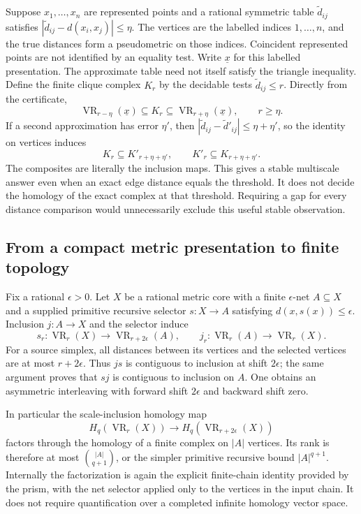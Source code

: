 Suppose $x_1,\ldots,x_n$ are represented points and a rational symmetric
table $\widetilde d_{ij}$ satisfies
$|\widetilde d_{ij}-d(x_i,x_j)|\leq\eta$.
The vertices are the labelled indices $1,\ldots,n$, and the true distances
form a pseudometric on those indices. Coincident represented points are
not identified by an equality test. Write $\underline x$ for this labelled
presentation. The approximate table need not itself satisfy the triangle
inequality. Define the finite clique complex $K_r$ by the decidable tests
$\widetilde d_{ij}\leq r$. Directly from the certificate,
\[
 \operatorname{VR}_{r-\eta}(\underline x)
       \subseteq K_r
       \subseteq\operatorname{VR}_{r+\eta}(\underline x),
 \qquad r\geq\eta.
 \label{ct:sandwich}
\]
If a second approximation has error $\eta'$, then
$|\widetilde d_{ij}-\widetilde d'_{ij}|\leq\eta+\eta'$, so the identity on
vertices induces
\[
             K_r\subseteq K'_{r+\eta+\eta'},\qquad
             K'_r\subseteq K_{r+\eta+\eta'}.
\]
The composites are literally the inclusion maps. This gives a stable
multiscale answer even when an exact edge distance equals the threshold.
It does not decide the homology of the exact complex at that threshold.
Requiring a gap for every distance comparison would unnecessarily exclude
this useful stable observation.

\subsection{From a compact metric presentation to finite topology}

Fix a rational $\epsilon>0$. Let $X$ be a rational metric core with a finite $\epsilon$-net $A\subseteq X$
and a supplied primitive recursive selector $s:X\to A$ satisfying
$d(x,s(x))\leq\epsilon$. Inclusion $j:A\to X$ and the selector induce
\[
 s_r:\operatorname{VR}_r(X)\to\operatorname{VR}_{r+2\epsilon}(A),
 \qquad j_r:\operatorname{VR}_r(A)\to\operatorname{VR}_r(X).
\]
For a source simplex, all distances between its vertices and the selected
vertices are at most $r+2\epsilon$. Thus $js$ is contiguous to inclusion
at shift $2\epsilon$; the same argument proves that $sj$ is contiguous to
inclusion on $A$. One obtains an asymmetric interleaving with forward
shift $2\epsilon$ and backward shift zero.

In particular the scale-inclusion homology map
\[
 H_q(\operatorname{VR}_r(X))\longrightarrow
 H_q(\operatorname{VR}_{r+2\epsilon}(X))
\]
factors through the homology of a finite complex on $|A|$ vertices. Its
rank is therefore at most
$\binom{|A|}{q+1}$, or the simpler primitive recursive bound
$|A|^{q+1}$. Internally the factorization is again the explicit finite-chain
identity provided by the prism, with the net selector applied only to the
vertices in the input chain. It does not require quantification over a
completed infinite homology vector space.

